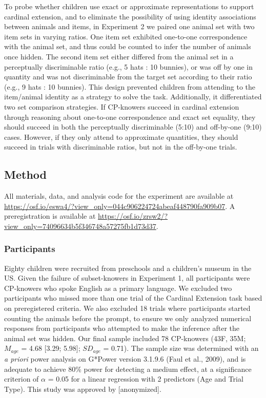 \documentclass[
  man,floatsintext]{apa7}
\begin{document}
To probe whether children use exact or approximate representations to support cardinal extension, and to eliminate the possibility of using identity associations between animals and items, in Experiment 2 we paired one animal set with two item sets in varying ratios. One item set exhibited one-to-one correspondence with the animal set, and thus could be counted to infer the number of animals once hidden. The second item set either differed from the animal set in a perceptually discriminable ratio (e.g., 5 hats : 10 bunnies), or was off by one in quantity and was not discriminable from the target set according to their ratio (e.g., 9 hats : 10 bunnies). This design prevented children from attending to the item/animal identity as a strategy to solve the task. Additionally, it differentiated two set comparison strategies. If CP-knowers succeed in cardinal extension through reasoning about one-to-one correspondence and exact set equality, they should succeed in both the perceptually discriminable (5:10) and off-by-one (9:10) cases. However, if they only attend to approximate quantities, they should succeed in trials with discriminable ratios, but not in the off-by-one trials.

\subsection{Method}\label{method-1}

All materials, data, and analysis code for the experiment are available at \url{https://osf.io/eswa4/?view_only=044c906224724abeaf448790fa909b07}. A preregistration is available at \url{https://osf.io/zrsw2/?view_only=74096634b5f346748a57275fb1d73d37}.

\subsubsection{Participants}\label{participants-1}

Eighty children were recruited from preschools and a children's museum in the US. Given the failure of subset-knowers in Experiment 1, all participants were CP-knowers who spoke English as a primary language. We excluded two participants who missed more than one trial of the Cardinal Extension task based on preregistered criteria. We also excluded 18 trials where participants started counting the animals before the prompt, to ensure we only analyzed numerical responses from participants who attempted to make the inference after the animal set was hidden. Our final sample included 78 CP-knowers (43F, 35M; \(M_{age}\) = 4.68 {[}3.29; 5.98{]}; \(SD_{age}\) = 0.71). The sample size was determined with an \emph{a priori} power analysis on G*Power version 3.1.9.6 (Faul et al., 2009), and is adequate to achieve 80\% power for detecting a medium effect, at a significance criterion of \(\alpha\) = 0.05 for a linear regression with 2 predictors (Age and Trial Type). This study was approved by {[}anonymized{]}.
\end{document}
